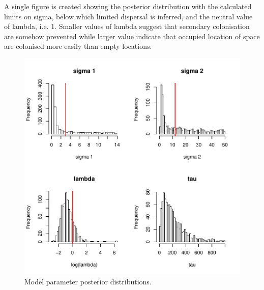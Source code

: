 \documentclass[a4paper]{article}
\begin{document}
\begin{Schunk}

\begin{Soutput}

\end{Soutput}
\end{Schunk}
\hspace{12pt}A single figure is created showing the posterior distribution with the calculated limits on sigma, below which limited dispersal is inferred, and the neutral value of lambda, i.e. 1.
Smaller values of lambda suggest that secondary colonisation are somehow prevented while larger value indicate that occupied location of space are colonised more easily than empty locations.\\

\begin{figure}[h!]
\begin{center}
\includegraphics[width=.7\textwidth]{figures/post_dist.pdf}
\caption{Model parameter posterior distributions.}
\end{center}
\end{figure}
\end{document}
